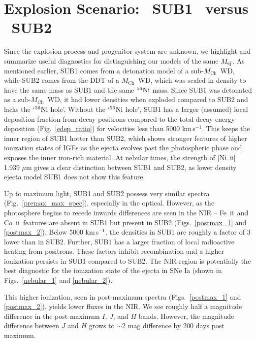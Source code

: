 \documentclass[useAMS,usenatbib,useasmath]{mnras}
\newcommand{\Mch}{\hbox{$M_{\text{Ch}}$}}
\newcommand{\kms}{\hbox{km$\,$s$^{-1}$}}
\newcommand{\elem}[2][default]{$^{#1}{\rm #2}$}
\newcommand{\feii}{\mbox{Fe~{\sc ii}}}
\newcommand{\coii}{\mbox{Co~{\sc ii}}}
\newcommand{\nkii}{\mbox{Ni~{\sc ii}}}
\def\fig{Fig.}
\def\figs{Figs.}
\begin{document}
\section{Explosion Scenario: \, SUB1 \, versus \, SUB2}%
\label{section_sub1_vs_sub2}
Since the explosion process and progenitor system are unknown, we highlight and summarize useful diagnostics for distinguishing our models of the same $M_{\rm ej}$. As mentioned earlier, SUB1 comes from a detonation model of a sub-\Mch\ WD, while SUB2 comes from the DDT of a \Mch\ WD, which was scaled in density to have the same mass as SUB1 and the same \elem[56]{Ni} mass. Since SUB1 was detonated as a sub-\Mch\ WD, it had lower densities when exploded compared to SUB2 and lacks the `\elem[56]{Ni} hole'. Without the `\elem[56]{Ni} hole', SUB1 has a larger (assumed) local deposition fraction from decay positrons compared to the total decay energy deposition (\fig~\ref{edep_ratio}) for velocities less than 5000 \kms. This keeps the inner region of SUB1 hotter than SUB2, which shows stronger features of higher ionization states of IGEs as the ejecta evolves past the photospheric phase and exposes the inner iron-rich material. At nebular times, the strength of [\nkii] 1.939 $\mu$m gives a clear distinction between SUB1 and SUB2, as lower density ejecta model SUB1 does not show this feature.

Up to maximum light, SUB1 and SUB2 possess very similar spectra (\fig~\ref{premax_max_spec}), especially in the optical. However, as the photosphere begins to recede inwards differences are seen in the NIR -- \feii\ and \coii\ features are absent in SUB1 but present in SUB2 (\figs~\ref{postmax_1} and \ref{postmax_2}). Below 5000 \kms, the densities in SUB1 are roughly a factor of 3 lower than in SUB2. Further, SUB1 has a larger fraction of local radioactive heating from positrons. These factors inhibit recombination and a higher ionization persists in SUB1 compared to SUB2. The NIR region is potentially the best diagnostic for the ionization state of the ejecta in SNe Ia (shown in \figs~\ref{nebular_1} and \ref{nebular_2}).

This higher ionization, seen in post-maximum spectra (\figs~\ref{postmax_1} and \ref{postmax_2}), yields lower fluxes in the NIR. We see roughly half a magnitude difference in the post maximum $I$, $J$, and $H$ bands. However, the magnitude difference between $J$ and $H$ grows to $\sim$2 mag difference by 200 days post maximum.
\end{document}
